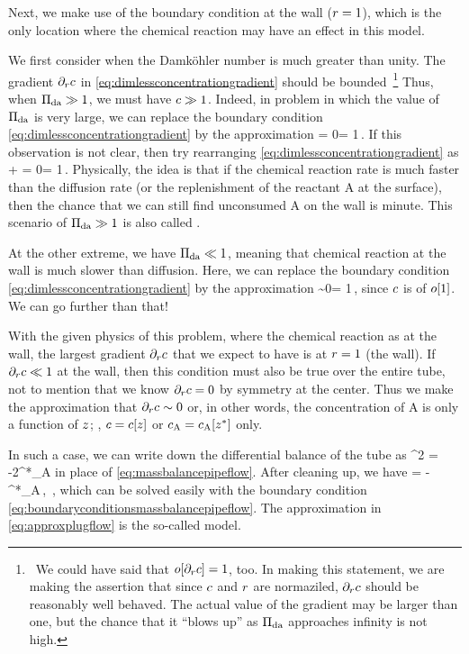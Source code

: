 Next, we make use of the boundary condition at the wall ($r = 1$), which is the only location where the chemical reaction may have an effect in this model.

We first consider when the Damköhler number is much greater than unity. The gradient $\partial_{r}c$ in \cref{eq:dimlessconcentrationgradient} should be bounded~\footnote{~We could have said that $o\!\left[{\partial_{r}c}\right] = 1$, too. In making this statement, we are making the assertion that since $c$ and $r$ are normaziled, $\partial_{r}c$ should be reasonably well behaved. The actual value of the gradient may be larger than one, but the chance that it ``blows up'' as $\Pi_\text{da}$ approaches infinity is not high.} Thus, when $\Pi_\text{da}\gg 1$, we must have $c\gg 1$. Indeed, in problem in which the value of $\Pi_\text{da}$ is very large, we can replace the boundary condition \cref{eq:dimlessconcentrationgradient} by the approximation
\beq
\conc = 0\quad{}\ndposr = 1\,.
\eeq
If this observation is not clear, then try rearranging \cref{eq:dimlessconcentrationgradient} as
\beq
{}\xpd\conc\ndposr + \conc = 0\quad{}\ndposr = 1\,.
\eeq
Physically, the idea is that if the chemical reaction rate is much faster than the diffusion rate (or the replenishment of the reactant \ce A at the surface), then the chance that we can still find unconsumed \ce A on the wall is minute. This scenario of $\Pi_\text{da}\gg 1$ is also called .

At the other extreme, we have $\Pi_\text{da}\ll 1$, meaning that chemical reaction at the wall is much slower than diffusion. Here, we can replace the boundary condition \cref{eq:dimlessconcentrationgradient} by the approximation
\beq
\xpd\conc\ndposr \sim 0\quad{}\ndposr = 1\,,
\eeq
since $c$ is of $o\!\left[{1}\right]$. We can go further than that!

With the given physics of this problem, where the chemical reaction as at the wall, the largest gradient $\partial_{r}c$ that we expect to have is at $r = 1$ (the wall). If $\partial_{r}c\ll 1$ at the wall, then this condition must also be true over the entire tube, not to mention that we know $\partial_{r}c = 0$ by symmetry at the center. Thus we make the approximation that $\partial_{r}c\sim 0$ or, in other words, the concentration of \ce A is only a function of $z$; \ie, $c = c\!\left[{z}\right]$ or $\conc_{\ce A} = \conc_{\ce A}\vat\posz$ only.

In such a case, we can write down the differential balance of the tube as
\beq
\pi\rradius^2\hat\lvel {} = -2\pi\rradius\kforcoeff\conc^*_{\ce A}
\eeq
in place of \cref{eq:massbalancepipeflow}. After cleaning up, we have
\bneq\label{eq:approxplugflow}
\hat\lvel{} = -\dfrac{2\kforcoeff}{\rradius}\conc^*_{\ce A}\,,\quad
{}\,,
\eneq
which can be solved easily with the boundary condition \cref{eq:boundaryconditionsmassbalancepipeflow}. The approximation in \cref{eq:approxplugflow} is the so-called  model.

